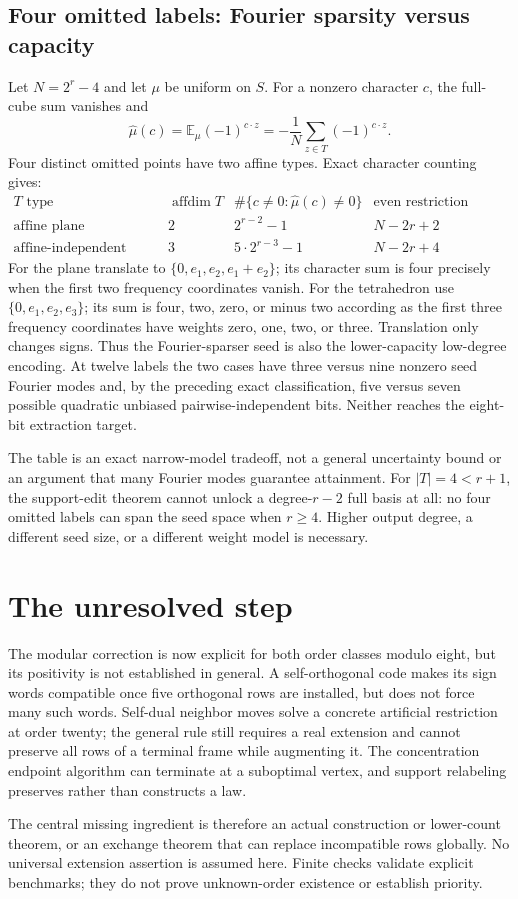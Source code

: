 \documentclass[11pt]{article}
\begin{document}
\subsection{Four omitted labels: Fourier sparsity versus capacity}
Let $N=2^r-4$ and let $\mu$ be uniform on $S$. For a nonzero character
$c$, the full-cube sum vanishes and
\[
 \widehat\mu(c)=\mathbb E_\mu(-1)^{c\cdot z}
 =-\frac1N\sum_{z\in T}(-1)^{c\cdot z}.
\]
Four distinct omitted points have two affine types. Exact character
counting gives:
\[
 \begin{array}{c|c|c|c}
 T\text{ type}&\operatorname{affdim}T&
 \#\{c\ne0:\widehat\mu(c)\ne0\}&
 \text{even restriction bilinear rank}\\\hline
 \text{affine plane}&2&2^{r-2}-1&N-2r+2\\
 \text{affine-independent tetrahedron}&3&5\cdot2^{r-3}-1&N-2r+4
 \end{array}
\]
For the plane translate to $\{0,e_1,e_2,e_1+e_2\}$; its character sum
is four precisely when the first two frequency coordinates vanish.
For the tetrahedron use $\{0,e_1,e_2,e_3\}$; its sum is four, two,
zero, or minus two according as the first three frequency coordinates
have weights zero, one, two, or three. Translation only changes signs.
Thus the Fourier-sparser seed is also the lower-capacity low-degree
encoding. At twelve labels the two cases have three versus nine nonzero
seed Fourier modes and, by the preceding exact classification, five
versus seven possible quadratic unbiased pairwise-independent bits.
Neither reaches the eight-bit extraction target.

The table is an exact narrow-model tradeoff, not a general uncertainty
bound or an argument that many Fourier modes guarantee attainment.
For $|T|=4<r+1$, the support-edit theorem cannot unlock a degree-$r-2$
full basis at all: no four omitted labels can span the seed space when
$r\ge4$. Higher output degree, a different seed size, or a different
weight model is necessary.

\section{The unresolved step}
The modular correction is now explicit for both order classes modulo
eight, but its positivity is not established in general.
A self-orthogonal code makes its sign words compatible once five
orthogonal rows are installed, but does not force many such words.
Self-dual neighbor moves solve a concrete artificial restriction at
order twenty; the general rule still requires a real extension and
cannot preserve all rows of a terminal frame while augmenting it.
The concentration endpoint algorithm can terminate at a suboptimal
vertex, and support relabeling preserves rather than constructs a law.

The central missing ingredient is therefore an actual construction
or lower-count theorem, or an exchange theorem that can replace
incompatible rows globally. No universal extension assertion is
assumed here. Finite checks validate explicit benchmarks; they do
not prove unknown-order existence or establish priority.
\end{document}
